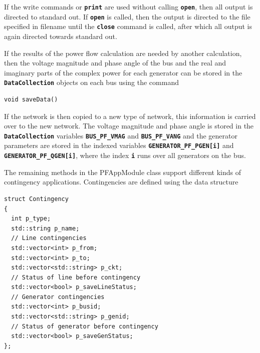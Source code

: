 \documentclass[12pt]{report} %
\begin{document}
If the write commands or \texttt{\textbf{print}} are used without calling \texttt{\textbf{open}}, then all output is directed to standard out. If \texttt{\textbf{open}} is called, then the output is directed to the file specified in filename until the \texttt{\textbf{close}} command is called, after which all output is again directed towards standard out.

If the results of the power flow calculation are needed by another calculation, then the voltage magnitude and phase angle of the bus and the real and imaginary parts of the complex power for each generator can be stored in the \texttt{\textbf{DataCollection}} objects on each bus using the command

{
\color{red}
\begin{Verbatim}[fontseries=b]
void saveData()
\end{Verbatim}
}

If the network is then copied to a new type of network, this information is carried over to the new network. The voltage magnitude and phase angle is stored in the \texttt{\textbf{DataCollection}} variables \texttt{\textbf{BUS\_PF\_VMAG}} and \texttt{\textbf{BUS\_PF\_VANG}} and the generator parameters are stored in the indexed variables \texttt{\textbf{GENERATOR\_PF\_PGEN[i]}} and \texttt{\textbf{GENERATOR\_PF\_QGEN[i]}}, where the index \texttt{\textbf{i}} runs over all generators on the bus.

The remaining methods in the PFAppModule class support different kinds of contingency applications. Contingencies are defined using the data structure

{
\color{red}
\begin{Verbatim}[fontseries=b]
struct Contingency
{
  int p_type;
  std::string p_name;
  // Line contingencies
  std::vector<int> p_from;
  std::vector<int> p_to;
  std::vector<std::string> p_ckt;
  // Status of line before contingency
  std::vector<bool> p_saveLineStatus;
  // Generator contingencies
  std::vector<int> p_busid;
  std::vector<std::string> p_genid;
  // Status of generator before contingency
  std::vector<bool> p_saveGenStatus;
};
\end{Verbatim}
}
\end{document}

